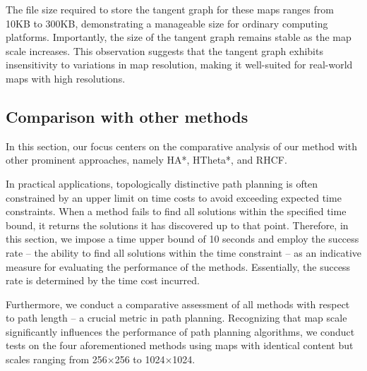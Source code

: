\documentclass[letterpaper, 10 pt, journal, twoside]{IEEEtran}
\begin{document}
The file size required to store the tangent graph for these maps ranges from 10KB to 300KB, demonstrating a manageable size for ordinary computing platforms. Importantly, the size of the tangent graph remains stable as the map scale increases. This observation suggests that the tangent graph exhibits insensitivity to variations in map resolution, making it well-suited for real-world maps with high resolutions.


\subsection{Comparison with other methods}

    
In this section, our focus centers on the comparative analysis of our method with other prominent approaches, namely HA*, HTheta*, and RHCF. 

In practical applications, topologically distinctive path planning is often constrained by an upper limit on time costs to avoid exceeding expected time constraints. When a method fails to find all solutions within the specified time bound, it returns the solutions it has discovered up to that point. Therefore, in this section, we impose a time upper bound of 10 seconds and employ the success rate – the ability to find all solutions within the time constraint – as an indicative measure for evaluating the performance of the methods. Essentially, the success rate is determined by the time cost incurred.

Furthermore, we conduct a comparative assessment of all methods with respect to path length – a crucial metric in path planning. Recognizing that map scale significantly influences the performance of path planning algorithms, we conduct tests on the four aforementioned methods using maps with identical content but scales ranging from 256$\times$256 to 1024$\times$1024.    
    
\end{document}
